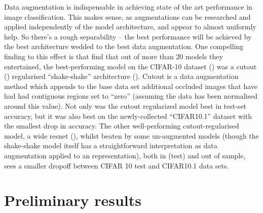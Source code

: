 \documentclass[10pt,twocolumn,letterpaper]{article}
\begin{document}
	Data augmentation is indispensable in achieving state of the art performance in image classification. This makes  sense, as augmentations can be researched and applied independently of the model architecture, and appear to almost uniformly help. So there's a rough separability -- the best performance will be achieved by the best architecture wedded to the best data augmentation.  One compelling finding to this effect is that \cite{Recht2018} find that out of more than 20 models they entertained, the best-performing model on the CIFAR-10 dataset (\cite{Krizhevsk2009}) was a cutout (\cite{Devries2017}) regularised ``shake-shake'' architecture (\cite{Gastaldi2017}). Cutout is a data augmentation method which appends to the base data set additional occluded images that have had had contiguous regions set to ``zero'' (assuming the data has been normalised around this value). 
	Not only was the cutout regularized model best in test-set accuracy, but it was also best on the newly-collected ``CIFAR10.1'' dataset with the smallest drop in accuracy. The other well-performing cutout-regularised model, a wide resnet (\cite{Zagoruyko2016}), whilst beaten by some un-augmented models (though the shake-shake model itself has a straightforward interpretation as data augmentation applied to an representation), both in (test) and out of sample, sees a smaller dropoff between CIFAR 10 test and CIFAR10.1 data sets. %



\section{Preliminary results}
\end{document}
